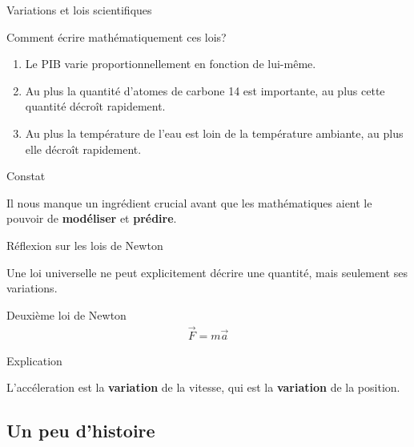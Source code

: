 \documentclass{beamer}
\begin{document}
\begin{frame}
    {Variations et lois scientifiques}

    Comment écrire mathématiquement ces lois?

    \begin{enumerate}
        \item Le PIB varie proportionnellement en fonction de lui-même.
            \pause{}
        \item Au plus la quantité d'atomes de carbone 14 est importante, au plus cette quantité décroît rapidement.
            \pause{}
        \item Au plus la température de l'eau est loin de la température ambiante, au plus elle décroît rapidement.
    \end{enumerate}

    \pause{}
    \begin{alertblock}
        {Constat}

        Il nous manque un ingrédient crucial avant que les mathématiques aient le pouvoir de \textbf{modéliser} et \textbf{prédire}.
    \end{alertblock}
\end{frame}

\begin{frame}
    {Réflexion sur les lois de Newton}

    Une loi universelle ne peut explicitement décrire une quantité,
    mais seulement ses variations.

    \begin{alertblock}
        {Deuxième loi de Newton}
        \begin{align*}
            \vec F = m \vec a
        \end{align*}
    \end{alertblock}
    \pause{}

    \begin{exampleblock}
        {Explication}

        L'accéleration est la \textbf{variation} de la vitesse,
        qui est la \textbf{variation} de la position.
    \end{exampleblock}
\end{frame}

\subsection{Un peu d'histoire}
\end{document}
